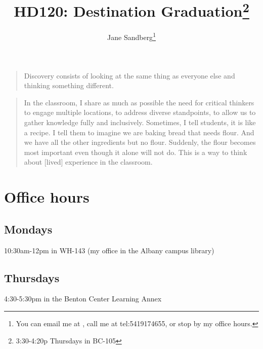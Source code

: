 \documentclass[12pt,article,oneside]{memoir}
\author{Jane Sandberg\thanks{You can email me at \htmladdnormallink{sandbej at linnbenton dot edu}{mailto:sandbej@linnbenton.edu}, call me at \htmladdnormallink{(541) 917 4655}	{tel:5419174655}, or stop by my office hours.}}
\title{HD120: Destination Graduation\thanks{3:30-4:20p Thursdays in BC-105}}
\begin{document}
\renewcommand{\labelitemi}{$\triangleright$}
\setcounter{secnumdepth}{0}
\tightlists


\maketitle


\begin{quotation}
Discovery consists of looking at the same thing as everyone else and thinking something different.

\end{quotation}

\begin{quotation}
In the classroom, I share as much as possible the need for critical thinkers to engage multiple locations, to address diverse standpoints, to allow us to gather knowledge fully and inclusively.  Sometimes, I tell students, it is like a recipe.  I tell them to imagine we are baking bread that needs flour.  And we have all the other ingredients but no flour.  Suddenly, the flour becomes most important even though it alone will not do.  This is a way to think about [lived] experience in the classroom.

\end{quotation}

\begin{htmlonly}
\tableofcontents
\end{htmlonly}
\newpage
\section{Office hours}

\subsection{Mondays}
10:30am-12pm in WH-143 (my office in the Albany campus library)

\subsection{Thursdays}
4:30-5:30pm in the Benton Center Learning Annex
\end{document}
